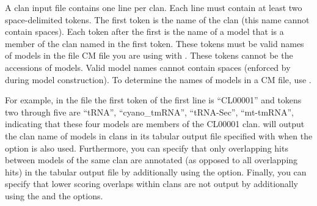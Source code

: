 A clan input file contains one line per clan. Each line must contain
at least two space-delimited tokens. The first token is the name of
the clan (this name cannot contain spaces). Each token after the first
is the name of a model that is a member of the clan named in the first
token. These tokens must be valid names of models in the file CM file
you are using with . These tokens cannot be the
accessions of models. Valid model names cannot contain spaces
(enforced by  during model construction). To determine
the names of models in a CM file, use . 

For example, in the file  the first token
of the first line is ``CL00001'' and tokens two through five are
``tRNA'', ``cyano\_tmRNA'', ``tRNA-Sec'', ``mt-tmRNA'', indicating
that these four models are members of the CL00001 clan. 
will output the clan name of models in clans in its tabular output
file specified with  when the  option
is also used. Furthermore, you can specify
that only overlapping hits between models of the same clan are
annotated (as opposed to all overlapping hits) in the tabular output
file by additionally using the  option. Finally, you
can specify that lower scoring overlaps within clans are not output by
additionally using the  and the 
options.




